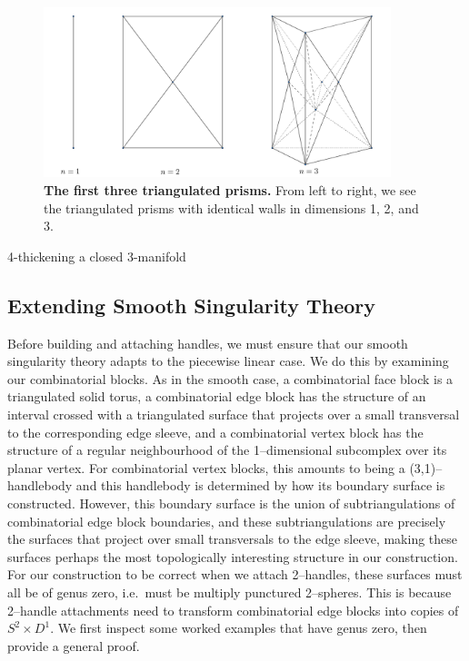 \begin{figure}[h!]
	\centering
	\includegraphics[width=0.9\textwidth]{figures/prisms.png}
	\caption{
		\textbf{The first three triangulated prisms.}
		From left to right, we see the triangulated prisms with identical walls in dimensions 1, 2, and 3.
	}
	\label{fig:prisms}
\end{figure}

\begin{algorithm}[h!]
	\caption{4-thickening a closed 3-manifold}
	\label{alg:4-thickening}
\end{algorithm}

\subsection{Extending Smooth Singularity Theory}

Before building and attaching handles, we must ensure that our smooth singularity theory adapts to the piecewise linear case.
We do this by examining our combinatorial blocks.
As in the smooth case, a combinatorial face block is a triangulated solid torus, a combinatorial edge block has the structure of an interval crossed with a triangulated surface that projects over a small transversal to the corresponding edge sleeve, and a combinatorial vertex block has the structure of a regular neighbourhood of the 1--dimensional subcomplex over its planar vertex.
For combinatorial vertex blocks, this amounts to being a (3,1)--handlebody and this handlebody is determined by how its boundary surface is constructed.
However, this boundary surface is the union of subtriangulations of combinatorial edge block boundaries, and these subtriangulations are precisely the surfaces that project over small transversals to the edge sleeve, making these surfaces perhaps the most topologically interesting structure in our construction.
For our construction to be correct when we attach 2--handles, these surfaces must all be of genus zero, i.e.\ must be multiply punctured 2--spheres.
This is because 2--handle attachments need to transform combinatorial edge blocks into copies of $S^2\times D^1$.
We first inspect some worked examples that have genus zero, then provide a general proof.

